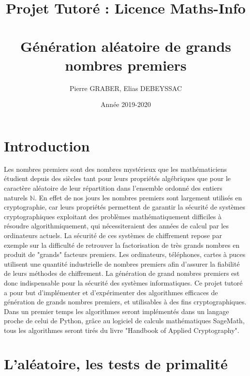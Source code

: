 \documentclass[a4paper,11pt]{article}
\title{Projet Tutoré : Licence Maths-Info
\section*{Génération aléatoire de grands nombres premiers }
\date{ Année 2019-2020}
}
\author{Pierre GRABER, Elias DEBEYSSAC}
\begin{document}
\maketitle

\section*{Introduction}
Les nombres premiers sont des nombres mystérieux que les mathématiciens étudient depuis des siècles tant pour leurs propriétés algébriques que pour le caractère  aléatoire de leur répartition dans l'ensemble ordonné des entiers naturels $\mathbb{N}$. En effet de nos jours les nombres premiers sont largement utilisés  en cryptographie, car  leurs propriétés permettent de garantir la sécurité de systèmes cryptographiques exploitant des problèmes mathématiquement difficiles à résoudre algorithmiquement, qui nécessiteraient des années de calcul par les ordinateurs actuels. \newline 
La sécurité de ces systèmes de chiffrement repose par exemple sur la difficulté de retrouver la factorisation de très grands nombres en produit de "grands" facteurs premiers. Les ordinateurs, téléphones, cartes à puces utilisent une quantité industrielle de nombres premiers afin d'assurer la fiabilité de leurs méthodes de chiffrement. La génération de grand nombres premiers est donc indispensable pour la sécurité des systèmes informatiques. Ce projet tutoré a pour but d'implémenter et d'expérimenter des algorithmes efficaces de génération de grands nombres premiers, et utilisables à des fins cryptographiques. Dans un premier temps les algorithmes seront implémentés dans un langage proche de celui de Python, grâce au logiciel de calculs mathématiques SageMath, tous les algorithmes seront tirés du livre "Handbook of Applied Cryptography".






\newpage
\tableofcontents


\newpage

\section{L'aléatoire, les tests de primalité}
\end{document}
